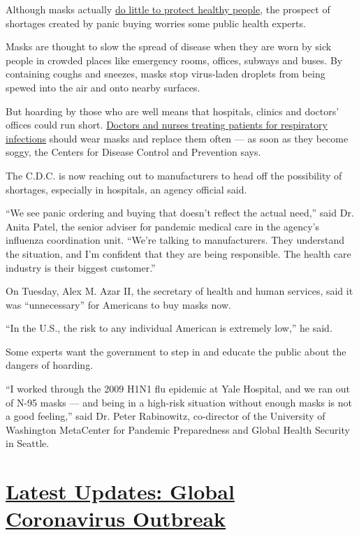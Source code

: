 Although masks actually
\href{https://www.nytimes.com/2020/01/28/opinion/coronavirus-prevention-tips.html?action=click\&module=Opinion\&pgtype=Homepage}{do
little to protect healthy people}, the prospect of shortages created by
panic buying worries some public health experts.

Masks are thought to slow the spread of disease when they are worn by
sick people in crowded places like emergency rooms, offices, subways and
buses. By containing coughs and sneezes, masks stop virus-laden droplets
from being spewed into the air and onto nearby surfaces.

But hoarding by those who are well means that hospitals, clinics and
doctors' offices could run short.
\href{https://www.nytimes.com/2020/02/14/world/asia/china-coronavirus-doctors.html}{Doctors
and nurses treating patients for respiratory infections} should wear
masks and replace them often --- as soon as they become soggy, the
Centers for Disease Control and Prevention says.

The C.D.C. is now reaching out to manufacturers to head off the
possibility of shortages, especially in hospitals, an agency official
said.

``We see panic ordering and buying that doesn't reflect the actual
need,'' said Dr. Anita Patel, the senior adviser for pandemic medical
care in the agency's influenza coordination unit. ``We're talking to
manufacturers. They understand the situation, and I'm confident that
they are being responsible. The health care industry is their biggest
customer.''

On Tuesday, Alex M. Azar II, the secretary of health and human services,
said it was ``unnecessary'' for Americans to buy masks now.

``In the U.S., the risk to any individual American is extremely low,''
he said.

Some experts want the government to step in and educate the public about
the dangers of hoarding.

``I worked through the 2009 H1N1 flu epidemic at Yale Hospital, and we
ran out of N-95 masks --- and being in a high-risk situation without
enough masks is not a good feeling,'' said Dr. Peter Rabinowitz,
co-director of the University of Washington MetaCenter for Pandemic
Preparedness and Global Health Security in Seattle.

\hypertarget{latest-updates-global-coronavirus-outbreak}{%
\section{\texorpdfstring{\href{https://www.nytimes.com/2020/08/01/world/coronavirus-covid-19.html?action=click\&pgtype=Article\&state=default\&region=MAIN_CONTENT_1\&context=storylines_live_updates}{Latest
Updates: Global Coronavirus
Outbreak}}{Latest Updates: Global Coronavirus Outbreak}}\label{latest-updates-global-coronavirus-outbreak}}

